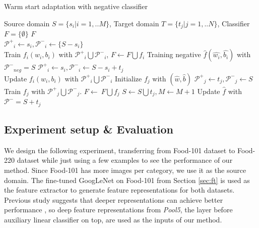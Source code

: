 \begin{algorithm}
  \caption{Warm start adaptation with negative classifier}\label{algo:ws}
  \begin{algorithmic}[1]
    \REQUIRE Source domain $S = \{ {s_i}|i = 1,..M\} $, Target domain $T = \{ {t_j}|j = 1,..N\} $, Classifier $F = \{\emptyset\}$
    \ENSURE $F$\\
         \STATE $\mathcal{P^+}_i \leftarrow s_i, \mathcal{P^-}_i\leftarrow \{S-s_i\}$\\
          Train ${{f_i}\left( {{w_i},{b_i}} \right)}$ with $\mathcal{P^+}_i\bigcup\mathcal{P^-}_i$, $F\leftarrow F\bigcup f_i$
    \ENDFOR
    \STATE Training negative $\hat{f}\left( {\hat{w_i},\hat{b_i}} \right)$ with $\mathcal{P^-}_{neg}=S$
             \STATE $\mathcal{P^+}_i \leftarrow s_i, \mathcal{P^-}_i \leftarrow S-s_i+t_j$ \\
              Update ${{f_i}\left( {{w_i},{b_i}} \right)}$ with $\mathcal{P^+}_i\bigcup\mathcal{P^-}_i$
        \ENDFOR
        \STATE Initialize $f_j$ with $(\hat{w},\hat{b})$
        \STATE $\mathcal{P^+}_j \leftarrow t_j, \mathcal{P^-}_j\leftarrow S$
        \STATE Train $f_j$ with $\mathcal{P^+}_j\bigcup\mathcal{P^-}_j$.
        \STATE $F\leftarrow\ F\bigcup f_j$
        \STATE $S\leftarrow S\bigcup t_j, M\leftarrow M+1$
        \STATE Update $\hat{f}$ with $\mathcal{P^-}=S+t_j$
     \ENDWHILE
  \end{algorithmic}
\end{algorithm}

\subsection{Experiment setup \& Evaluation}
We design the following experiment, transferring from Food-101 dataset to Food-220 dataset while just using a few examples to see the performance of our method. Since Food-101 has more images per category, we use it as the source domain. The fine-tuned GoogLeNet on Food-101 from Section \ref{sec:ft} is used as the feature extractor to generate feature representations for both datasets. Previous study suggests that deeper representations can achieve better performance \cite{hoffman2013one}, so deep feature representations from \emph{Pool5}, the layer before auxiliary linear classifier on top, are used as the inputs of our method.


